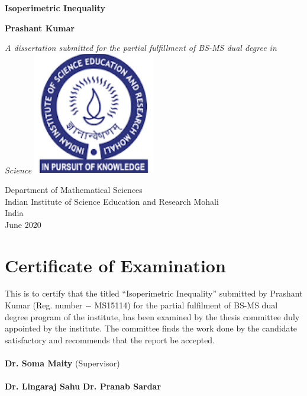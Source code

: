 \documentclass[oneside]{book}
\date{\today}
\begin{document}
	
	\begin{titlepage}
		\begin{center}
			\vspace*{1cm}
			
			\Huge
			\textbf{Isoperimetric Inequality}
			
			\vspace{0.5cm}
			\LARGE
			
			
			\vspace{1.5cm}
			
			\textbf{Prashant Kumar}
			
			\vfill
			
			\textit{A dissertation submitted for the partial fulfillment of BS-MS dual degree in Science}          
			\vspace{0.9cm}
						\includegraphics[width=0.4\textwidth]{iiser logo.png}        
			
			\Large
			Department of Mathematical Sciences\\
			Indian Institute of Science Education and Research Mohali\\
			India\\
			June 2020
			
		\end{center}
	\end{titlepage}
	
	
	
	
	
	\tableofcontents
	
	
	\thispagestyle{empty}
	\chapter*{Certificate of Examination}
	
	This is to certify that the titled \enquote{Isoperimetric Inequality} submitted by Prashant Kumar (Reg. number $-$ MS15114) for the partial fulfilment of BS-MS dual degree program of the institute, has been examined by the thesis committee duly appointed by the institute. The committee finds the work done by the candidate satisfactory and recommends that the report be accepted.\\\\
	\textbf{Dr. Soma Maity} (Supervisor)\\
	\\
	\textbf{Dr. Lingaraj Sahu}  \hfill           \textbf{ Dr. Pranab Sardar}\\
	\\
	\\
	\thispagestyle{empty}
	
\end{document}
